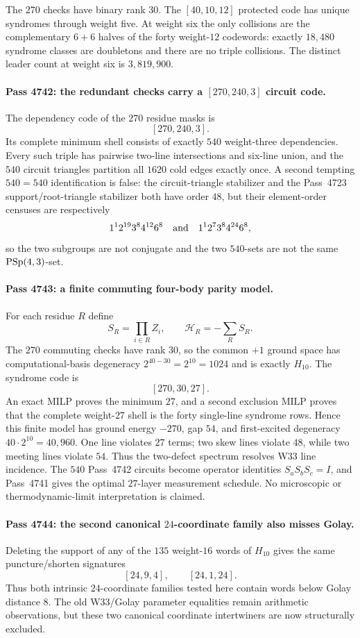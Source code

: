 The $270$ checks have binary rank $30$.  The $[40,10,12]$ protected code has
unique syndromes through weight five.  At weight six the only collisions are
the complementary $6+6$ halves of the forty weight-$12$ codewords: exactly
$18{,}480$ syndrome classes are doubletons and there are no triple collisions.
The distinct leader count at weight six is $3{,}819{,}900$.

\paragraph{Pass 4742: the redundant checks carry a $[270,240,3]$ circuit code.}
The dependency code of the $270$ residue masks is
\[
 \boxed{[270,240,3]}.
\]
Its complete minimum shell consists of exactly $540$ weight-three dependencies.
Every such triple has pairwise two-line intersections and six-line union, and
the $540$ circuit triangles partition all $1620$ cold edges exactly once.  A
second tempting $540=540$ identification is false: the circuit-triangle
stabilizer and the Pass~4723 support/root-triangle stabilizer both have order
$48$, but their element-order censuses are respectively
\[
 1^1 2^{19}3^8 4^{12}6^8
 \quad\hbox{and}\quad
 1^1 2^7 3^8 4^{24}6^8,
\]
so the two subgroups are not conjugate and the two $540$-sets are not the same
$\mathrm{PSp}(4,3)$-set.

\paragraph{Pass 4743: a finite commuting four-body parity model.}
For each residue $R$ define
\[
 S_R=\prod_{i\in R}Z_i,
 \qquad
 \mathcal H_R=-\sum_R S_R.
\]
The $270$ commuting checks have rank $30$, so the common $+1$ ground space has
computational-basis degeneracy $2^{40-30}=2^{10}=1024$ and is exactly
$H_{10}$.  The syndrome code is
\[
 \boxed{[270,30,27]}.
\]
An exact MILP proves the minimum $27$, and a second exclusion MILP proves that
the complete weight-$27$ shell is the forty single-line syndrome rows.  Hence
this finite model has ground energy $-270$, gap $54$, and first-excited
degeneracy $40\cdot2^{10}=40{,}960$.  One line violates $27$ terms; two skew
lines violate $48$, while two meeting lines violate $54$.  Thus the two-defect
spectrum resolves W33 line incidence.  The $540$ Pass~4742 circuits become
operator identities $S_aS_bS_c=I$, and Pass~4741 gives the optimal $27$-layer
measurement schedule.  No microscopic or thermodynamic-limit interpretation is
claimed.

\paragraph{Pass 4744: the second canonical $24$-coordinate family also misses Golay.}
Deleting the support of any of the $135$ weight-$16$ words of $H_{10}$ gives the
same puncture/shorten signatures
\[
 \boxed{[24,9,4]},\qquad \boxed{[24,1,24]}.
\]
Thus both intrinsic $24$-coordinate families tested here contain words below
Golay distance $8$.  The old W33/Golay parameter equalities remain arithmetic
observations, but these two canonical coordinate intertwiners are now
structurally excluded.

